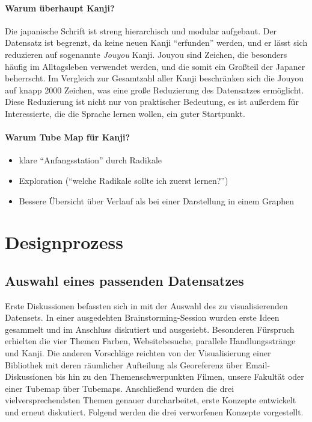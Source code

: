 \documentclass[color,german]{tudbook}
\begin{document}
\paragraph{Warum überhaupt Kanji?}
Die japanische Schrift ist streng hierarchisch und modular aufgebaut. Der Datensatz ist begrenzt, da keine neuen Kanji "`erfunden"' werden, und er lässt sich reduzieren auf sogenannte \emph{Jouyou} Kanji. Jouyou sind Zeichen, die besonders häufig im Alltagsleben verwendet werden, und die somit ein Großteil der Japaner beherrscht. Im Vergleich zur Gesamtzahl aller Kanji beschränken sich die Jouyou auf knapp 2000 Zeichen, was eine große Reduzierung des Datensatzes ermöglicht.
Diese Reduzierung ist nicht nur von praktischer Bedeutung, es ist außerdem für Interessierte, die die Sprache lernen wollen, ein guter Startpunkt. 

\paragraph{Warum Tube Map für Kanji?}
\begin{itemize}
\item klare "`Anfangsstation"' durch Radikale
\item Exploration ("`welche Radikale sollte ich zuerst lernen?"')
\item Bessere Übersicht über Verlauf als bei einer Darstellung in einem Graphen
\end{itemize}

\section{Designprozess}

\subsection{Auswahl eines passenden Datensatzes}

Erste Diskussionen befassten sich in mit der Auswahl des zu visualisierenden Datensets. In einer ausgedehten Brainstorming-Session wurden erste Ideen gesammelt und im Anschluss diskutiert und ausgesiebt. Besonderen Fürspruch erhielten die vier Themen Farben, Websitebesuche, parallele Handlungsstränge und Kanji. Die anderen Vorschläge reichten von der Visualisierung einer Bibliothek mit deren räumlicher Aufteilung als Georeferenz über Email-Diskussionen bis hin zu den Themenschwerpunkten Filmen, unsere Fakultät oder einer Tubemap über Tubemaps. Anschließend wurden die drei vielversprechendsten Themen genauer durcharbeitet, erste Konzepte entwickelt und erneut diskutiert. Folgend werden die drei verworfenen Konzepte vorgestellt.
\end{document}
